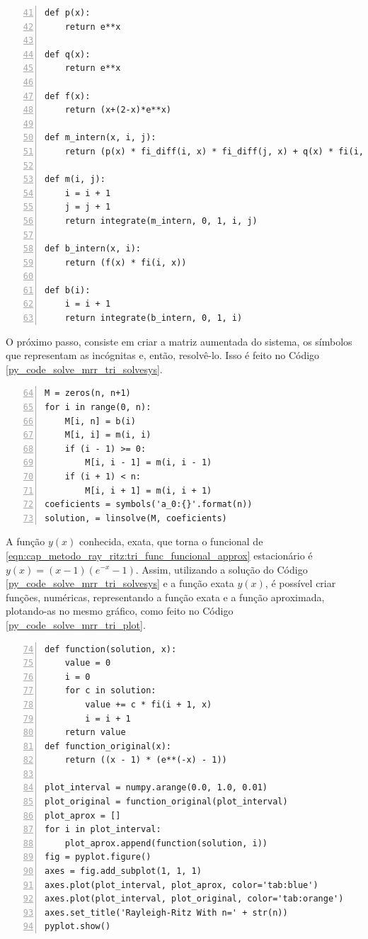 \documentclass[
	12pt,				%
	openright,			%
    twoside,			%
	a4paper,			%
	english,			%
	french,				%
	spanish,			%
	brazil				%
	]{abntex2}
\numberwithin{lema}{chapter}
\numberwithin{teorema}{chapter}
\numberwithin{definicao}{chapter}
\numberwithin{exemplo}{chapter}
\numberwithin{figure}{chapter}
\begin{document}
\begin{lstlisting}[style=Python, xleftmargin=2em, numbers=left, firstnumber=41, caption={Funções utilizadas para criação das matrizes do sistema linear}, captionpos=t, label=py_code_solve_mrr_tri_m_b]
def p(x):
    return e**x

def q(x):
    return e**x

def f(x):
    return (x+(2-x)*e**x)

def m_intern(x, i, j):
    return (p(x) * fi_diff(i, x) * fi_diff(j, x) + q(x) * fi(i, x) * fi(j, x))

def m(i, j):
    i = i + 1
    j = j + 1
    return integrate(m_intern, 0, 1, i, j)

def b_intern(x, i):
    return (f(x) * fi(i, x))

def b(i):
    i = i + 1
    return integrate(b_intern, 0, 1, i)
\end{lstlisting}

O próximo passo, consiste em criar a matriz aumentada do sistema, os símbolos que representam as incógnitas e, então, resolvê-lo. Isso é feito no Código \ref{py_code_solve_mrr_tri_solvesys}.

\begin{lstlisting}[style=Python, xleftmargin=2em, numbers=left, firstnumber=64, caption={Definição e resolução do sistema linear}, captionpos=t, label=py_code_solve_mrr_tri_solvesys]
M = zeros(n, n+1)
for i in range(0, n):
    M[i, n] = b(i)
    M[i, i] = m(i, i)
    if (i - 1) >= 0:
        M[i, i - 1] = m(i, i - 1)
    if (i + 1) < n:
        M[i, i + 1] = m(i, i + 1)
coeficients = symbols('a_0:{}'.format(n))
solution, = linsolve(M, coeficients)
\end{lstlisting}

A função $y(x)$ conhecida, exata, que torna o funcional de \eqref{eqn:cap_metodo_ray_ritz:tri_func_funcional_approx} estacionário é $y(x)=(x-1)(e^{-x}-1)$. Assim, utilizando a solução do Código \ref{py_code_solve_mrr_tri_solvesys} e a função exata $y(x)$, é possível criar funções, numéricas, representando a função exata e a função aproximada, plotando-as no mesmo gráfico, como feito no Código \ref{py_code_solve_mrr_tri_plot}.

\begin{lstlisting}[style=Python, xleftmargin=2em, numbers=left, firstnumber=74, caption={Plotagem das funções exata e aproximada}, captionpos=t, label=py_code_solve_mrr_tri_plot]
def function(solution, x):
    value = 0
    i = 0
    for c in solution:
        value += c * fi(i + 1, x)
        i = i + 1
    return value
def function_original(x):
    return ((x - 1) * (e**(-x) - 1))

plot_interval = numpy.arange(0.0, 1.0, 0.01)
plot_original = function_original(plot_interval)
plot_aprox = []
for i in plot_interval:
    plot_aprox.append(function(solution, i))
fig = pyplot.figure()
axes = fig.add_subplot(1, 1, 1)
axes.plot(plot_interval, plot_aprox, color='tab:blue')
axes.plot(plot_interval, plot_original, color='tab:orange')
axes.set_title('Rayleigh-Ritz With n=' + str(n))
pyplot.show()
\end{lstlisting}
\end{document}
